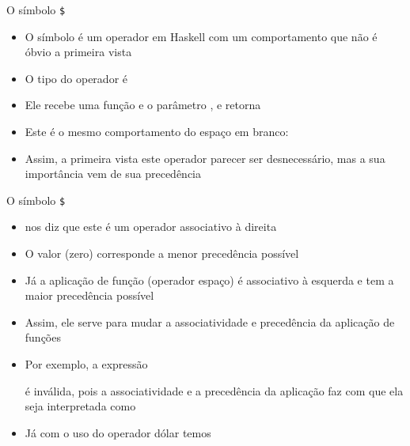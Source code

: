 \begin{frame}[fragile]{O símbolo {\tt \$}} 

    \begin{itemize}
        \item O símbolo   é um operador em Haskell com um comportamento
            que não é óbvio a primeira vista

        \item O tipo do operador  é


        \item Ele recebe uma função  e o parâmetro ,
            e retorna 

        \item Este é o mesmo comportamento do espaço em branco:


        \item Assim, a primeira vista este operador parecer ser desnecessário, mas a sua
            importância vem de sua precedência

    \end{itemize}

\end{frame}

\begin{frame}[fragile]{O símbolo {\tt \$}} 

    \begin{itemize}
        \item {} nos diz que este é um operador associativo à direita

        \item O valor  (zero) corresponde a menor precedência possível

        \item Já a aplicação de função (operador espaço) é associativo à esquerda e tem a
            maior precedência possível

        \item Assim, ele serve para mudar a associatividade e precedência da aplicação de funções

        \item Por exemplo, a expressão


        é inválida, pois a associatividade e a precedência da aplicação faz com que ela seja
         interpretada como


        \item Já com o uso do operador dólar temos

    \end{itemize}

\end{frame}
